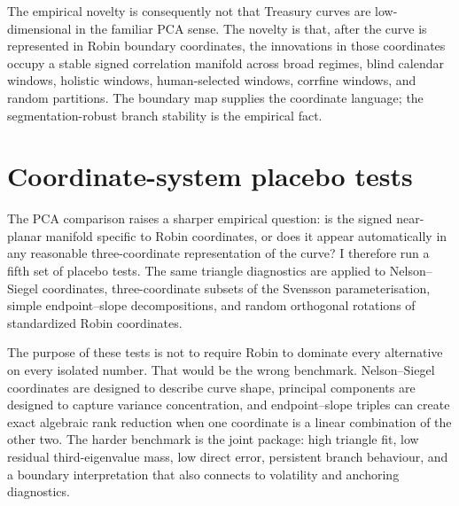 \documentclass[11pt]{article}
\begin{document}
The empirical novelty is consequently not that Treasury curves are low-dimensional in the familiar PCA sense. The novelty is that, after the curve is represented in Robin boundary coordinates, the innovations in those coordinates occupy a stable signed correlation manifold across broad regimes, blind calendar windows, holistic windows, human-selected windows, corrfine windows, and random partitions. The boundary map supplies the coordinate language; the segmentation-robust branch stability is the empirical fact.


\section{Coordinate-system placebo tests}
\label{sec:placebo_tests}

The PCA comparison raises a sharper empirical question: is the signed near-planar manifold specific to Robin coordinates, or does it appear automatically in any reasonable three-coordinate representation of the curve? I therefore run a fifth set of placebo tests. The same triangle diagnostics are applied to Nelson--Siegel coordinates, three-coordinate subsets of the Svensson parameterisation, simple endpoint--slope decompositions, and random orthogonal rotations of standardized Robin coordinates.

The purpose of these tests is not to require Robin to dominate every alternative on every isolated number. That would be the wrong benchmark. Nelson--Siegel coordinates are designed to describe curve shape, principal components are designed to capture variance concentration, and endpoint--slope triples can create exact algebraic rank reduction when one coordinate is a linear combination of the other two. The harder benchmark is the joint package: high triangle fit, low residual third-eigenvalue mass, low direct error, persistent branch behaviour, and a boundary interpretation that also connects to volatility and anchoring diagnostics.
\end{document}
